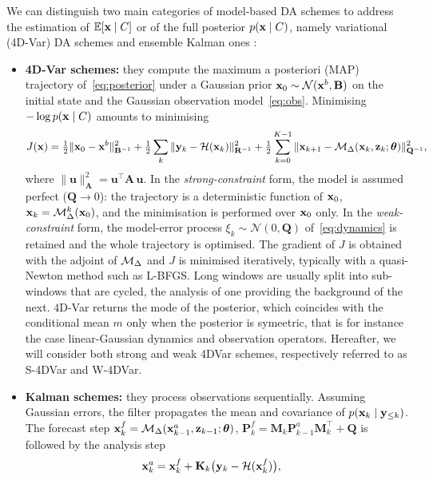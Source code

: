 We can distinguish two main categories of model-based DA schemes to address the
estimation of $\mathbb{E}[\mathbf{x} \mid C]$ or of the full posterior $p(\mathbf{x} \mid C)$, namely
variational (4D-Var) DA schemes and ensemble Kalman ones \cite{carrassi_data_2018,cheng_machine_2023}:
\begin{itemize}
    \item {\bf 4D-Var schemes:} they compute the maximum a posteriori (MAP) trajectory of~\eqref{eq:posterior} under a Gaussian prior $\mathbf{x}_0 \sim \mathcal{N}(\mathbf{x}^b, \mathbf{B})$ on the initial state and the Gaussian observation model~\eqref{eq:obs}. Minimising $-\log p(\mathbf{x} \mid C)$ amounts to minimising
\begin{equation}\label{eq:4dvar}
  J(\mathbf{x}) = \tfrac12 \|\mathbf{x}_0 - \mathbf{x}^b\|^2_{\mathbf{B}^{-1}}
  + \tfrac12 \sum_{k} \|\mathbf{y}_k - \mathcal{H}(\mathbf{x}_k)\|^2_{\mathbf{R}^{-1}}
  + \tfrac12 \sum_{k=0}^{K-1} \|\mathbf{x}_{k+1} - \mathcal{M}_\Delta(\mathbf{x}_k, \mathbf{z}_k;
  \boldsymbol{\theta})\|^2_{\mathbf{Q}^{-1}},
\end{equation}
where $\|\mathbf{u}\|^2_{\mathbf{A}} = \mathbf{u}^\top \mathbf{A}\, \mathbf{u}$.
In the \emph{strong-constraint} form, the model is assumed perfect
($\mathbf{Q} \to 0$): the trajectory is a deterministic function of $\mathbf{x}_0$,
$\mathbf{x}_k = \mathcal{M}_\Delta^{k}(\mathbf{x}_0)$, and the minimisation is performed over $\mathbf{x}_0$
only. In the \emph{weak-constraint} form, the model-error process $\xi_k \sim
\mathcal{N}(0,\mathbf{Q})$ of~\eqref{eq:dynamics} is retained and the whole
trajectory is optimised. The gradient of $J$ is obtained with the adjoint of
$\mathcal{M}_\Delta$ and $J$ is minimised iteratively, typically with a quasi-Newton
method such as L-BFGS. Long windows are usually split into sub-windows that are
cycled, the analysis of one providing the background of the next. 4D-Var returns
the mode of the posterior, which coincides with the conditional mean $m$ only
when the posterior is symeetric, that is for instance the case linear-Gaussian dynamics and observation
operators. Hereafter, we will consider both strong and weak 4DVar schemes, respectively referred to as S-4DVar and W-4DVar.
\item {\bf Kalman schemes:} they process observations sequentially. Assuming Gaussian errors, the filter propagates the mean and covariance of $p(\mathbf{x}_k \mid
\mathbf{y}_{\le k})$. The forecast step $\mathbf{x}^f_k = \mathcal{M}_\Delta(\mathbf{x}^a_{k-1}, \mathbf{z}_{k-1}; \boldsymbol{\theta})$, $\mathbf{P}^f_k = \mathbf{M}_k \mathbf{P}^a_{k-1} \mathbf{M}_k^\top + \mathbf{Q}$ is followed by the analysis step
\begin{equation}\label{eq:kalman}
  \xv^a_k = \xv^f_k + \mathbf{K}_k\big(\yv_k - \Hop(\xv^f_k)\big), \quad

\end{equation}
\end{itemize}
